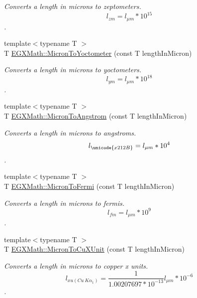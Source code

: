 \begin{DoxyCompactItemize}
\begin{DoxyCompactList}\small\item\em Converts a length in microns to zeptometers. \[ l_{zm}=l_{\mu m} * 10^{15} \]. \end{DoxyCompactList}\item 
{\footnotesize template$<$typename T $>$ }\\T \mbox{\hyperlink{group___e_g_x_math-_conversions-_length_conversions-_non-_s_i-_micron-_s_i_ga7a8a8c3b2da69390b326436deaffd582}{E\+G\+X\+Math\+::\+Micron\+To\+Yoctometer}} (const T length\+In\+Micron)
\begin{DoxyCompactList}\small\item\em Converts a length in microns to yoctometers. \[ l_{ym}=l_{\mu m} * 10^{18} \]. \end{DoxyCompactList}\item 
{\footnotesize template$<$typename T $>$ }\\T \mbox{\hyperlink{group___e_g_x_math-_conversions-_length_conversions-_non-_s_i-_micron-_non-_s_i_ga34f8c07bfb65b584298dd7be114b85ad}{E\+G\+X\+Math\+::\+Micron\+To\+Angstrom}} (const T length\+In\+Micron)
\begin{DoxyCompactList}\small\item\em Converts a length in microns to angstroms. \[ l_{\unicode{x212B}}=l_{\mu m} * 10^{4} \]. \end{DoxyCompactList}\item 
{\footnotesize template$<$typename T $>$ }\\T \mbox{\hyperlink{group___e_g_x_math-_conversions-_length_conversions-_non-_s_i-_micron-_non-_s_i_ga15284641d32129d8a82d4e50eaea346d}{E\+G\+X\+Math\+::\+Micron\+To\+Fermi}} (const T length\+In\+Micron)
\begin{DoxyCompactList}\small\item\em Converts a length in microns to fermis. \[ l_{fm}=l_{\mu m} * 10^{9} \]. \end{DoxyCompactList}\item 
{\footnotesize template$<$typename T $>$ }\\T \mbox{\hyperlink{group___e_g_x_math-_conversions-_length_conversions-_non-_s_i-_micron-_non-_s_i_gaa582745d86b8b016faa9ad442b18ce8f}{E\+G\+X\+Math\+::\+Micron\+To\+Cu\+X\+Unit}} (const T length\+In\+Micron)
\begin{DoxyCompactList}\small\item\em Converts a length in microns to copper x units. \[ l_{xu(Cu\ K\alpha_1)}= \frac{1}{1.00207697*10^{-13}} l_{\mu m} * 10^{-6}\]. \end{DoxyCompactList}\item 

\end{DoxyCompactItemize}
